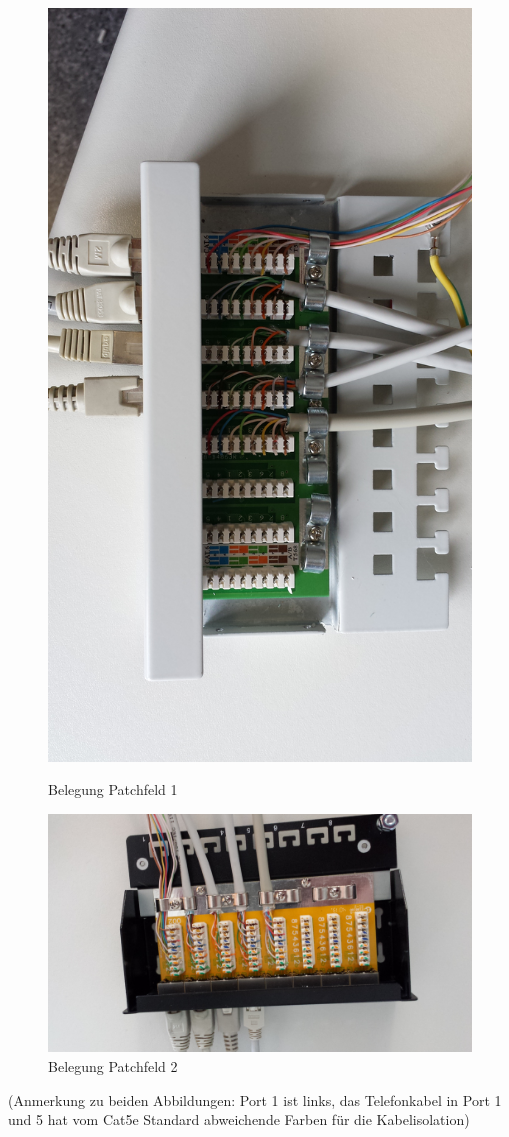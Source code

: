\documentclass[12pt,a4paper,titlepage]{scrartcl} %
\begin{document}
\begin{figure}[H]
\centering\includegraphics[width=\textwidth]{Bilder/Patchfeld1Belegung}
\caption{Belegung Patchfeld 1}\label{fig:Patch1}
\centering\includegraphics[angle=180,width=\textwidth]{Bilder/Patchfeld2Belegung}
\caption{Belegung Patchfeld 2}\label{fig:Patch2}
\end{figure}
(Anmerkung zu beiden Abbildungen: Port 1 ist links, das Telefonkabel in Port 1 und 5 hat vom Cat5e Standard abweichende Farben für die Kabelisolation)
\end{document}
